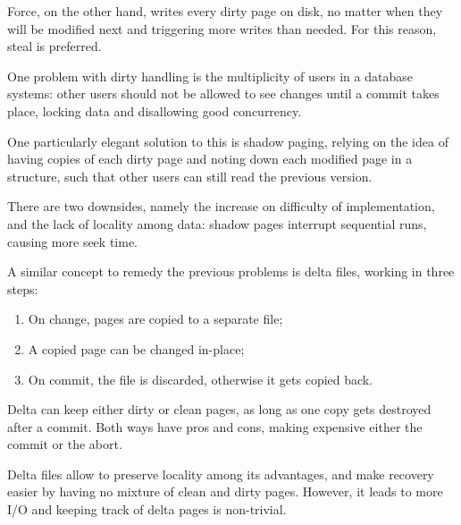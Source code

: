 Force, on the other hand, writes every dirty page on disk, no matter when they will be modified next and triggering more writes than needed.
For this reason, steal is preferred.

One problem with dirty handling is the multiplicity of users in a database systems: other users should not be allowed to see changes until a commit takes place, locking data and disallowing good concurrency. 

One particularly elegant solution to this is shadow paging, relying on the idea of having copies of each dirty page and noting down each modified page in a structure, such that other users can still read the previous version.

There are two downsides, namely the increase on difficulty of implementation, and the lack of locality among data: shadow pages interrupt sequential runs, causing more seek time.

A similar concept to remedy the previous problems is delta files, working in three steps:
\begin{enumerate}
	\item On change, pages are copied to a separate file;
	\item A copied page can be changed in-place;
	\item On commit, the file is discarded, otherwise it gets copied back. 
\end{enumerate}
Delta can keep either dirty or clean pages, as long as one copy gets destroyed after a commit. Both ways have pros and cons, making expensive either the commit or the abort.

Delta files allow to preserve locality among its advantages, and make recovery easier by having no mixture of clean and dirty pages. However, it leads to more I/O and keeping track of delta pages is non-trivial.

 

